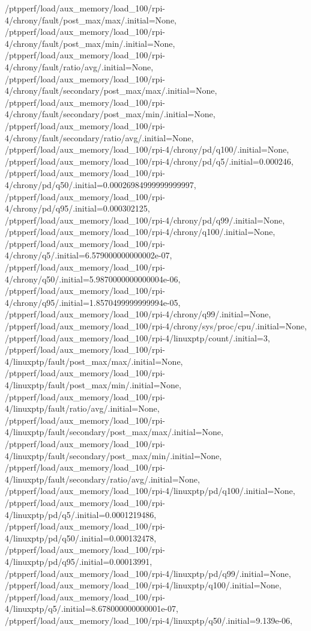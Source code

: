{    /ptpperf/load/aux_memory/load_100/rpi-4/chrony/fault/post_max/max/.initial=None,
    /ptpperf/load/aux_memory/load_100/rpi-4/chrony/fault/post_max/min/.initial=None,
    /ptpperf/load/aux_memory/load_100/rpi-4/chrony/fault/ratio/avg/.initial=None,
    /ptpperf/load/aux_memory/load_100/rpi-4/chrony/fault/secondary/post_max/max/.initial=None,
    /ptpperf/load/aux_memory/load_100/rpi-4/chrony/fault/secondary/post_max/min/.initial=None,
    /ptpperf/load/aux_memory/load_100/rpi-4/chrony/fault/secondary/ratio/avg/.initial=None,
    /ptpperf/load/aux_memory/load_100/rpi-4/chrony/pd/q100/.initial=None,
    /ptpperf/load/aux_memory/load_100/rpi-4/chrony/pd/q5/.initial=0.000246,
    /ptpperf/load/aux_memory/load_100/rpi-4/chrony/pd/q50/.initial=0.00026984999999999997,
    /ptpperf/load/aux_memory/load_100/rpi-4/chrony/pd/q95/.initial=0.000302125,
    /ptpperf/load/aux_memory/load_100/rpi-4/chrony/pd/q99/.initial=None,
    /ptpperf/load/aux_memory/load_100/rpi-4/chrony/q100/.initial=None,
    /ptpperf/load/aux_memory/load_100/rpi-4/chrony/q5/.initial=6.579000000000002e-07,
    /ptpperf/load/aux_memory/load_100/rpi-4/chrony/q50/.initial=5.9870000000000004e-06,
    /ptpperf/load/aux_memory/load_100/rpi-4/chrony/q95/.initial=1.8570499999999994e-05,
    /ptpperf/load/aux_memory/load_100/rpi-4/chrony/q99/.initial=None,
    /ptpperf/load/aux_memory/load_100/rpi-4/chrony/sys/proc/cpu/.initial=None,
    /ptpperf/load/aux_memory/load_100/rpi-4/linuxptp/count/.initial=3,
    /ptpperf/load/aux_memory/load_100/rpi-4/linuxptp/fault/post_max/max/.initial=None,
    /ptpperf/load/aux_memory/load_100/rpi-4/linuxptp/fault/post_max/min/.initial=None,
    /ptpperf/load/aux_memory/load_100/rpi-4/linuxptp/fault/ratio/avg/.initial=None,
    /ptpperf/load/aux_memory/load_100/rpi-4/linuxptp/fault/secondary/post_max/max/.initial=None,
    /ptpperf/load/aux_memory/load_100/rpi-4/linuxptp/fault/secondary/post_max/min/.initial=None,
    /ptpperf/load/aux_memory/load_100/rpi-4/linuxptp/fault/secondary/ratio/avg/.initial=None,
    /ptpperf/load/aux_memory/load_100/rpi-4/linuxptp/pd/q100/.initial=None,
    /ptpperf/load/aux_memory/load_100/rpi-4/linuxptp/pd/q5/.initial=0.0001219486,
    /ptpperf/load/aux_memory/load_100/rpi-4/linuxptp/pd/q50/.initial=0.000132478,
    /ptpperf/load/aux_memory/load_100/rpi-4/linuxptp/pd/q95/.initial=0.00013991,
    /ptpperf/load/aux_memory/load_100/rpi-4/linuxptp/pd/q99/.initial=None,
    /ptpperf/load/aux_memory/load_100/rpi-4/linuxptp/q100/.initial=None,
    /ptpperf/load/aux_memory/load_100/rpi-4/linuxptp/q5/.initial=8.678000000000001e-07,
    /ptpperf/load/aux_memory/load_100/rpi-4/linuxptp/q50/.initial=9.139e-06,
}
